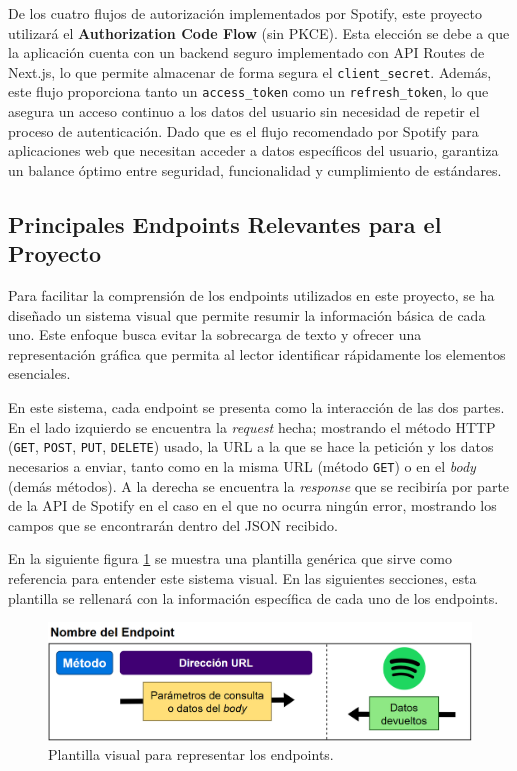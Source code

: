 De los cuatro flujos de autorización implementados por Spotify, este proyecto utilizará el \textbf{Authorization Code Flow} (sin PKCE). Esta elección se debe a que la aplicación cuenta con un backend seguro implementado con API Routes de Next.js, lo que permite almacenar de forma segura el \texttt{client\_secret}. Además, este flujo proporciona tanto un \texttt{access\_token} como un \texttt{refresh\_token}, lo que asegura un acceso continuo a los datos del usuario sin necesidad de repetir el proceso de autenticación. Dado que es el flujo recomendado por Spotify para aplicaciones web que necesitan acceder a datos específicos del usuario, garantiza un balance óptimo entre seguridad, funcionalidad y cumplimiento de estándares.

\subsection{Principales Endpoints Relevantes para el Proyecto}

Para facilitar la comprensión de los endpoints utilizados en este proyecto, se ha diseñado un sistema visual que permite resumir la información básica de cada uno. Este enfoque busca evitar la sobrecarga de texto y ofrecer una representación gráfica que permita al lector identificar rápidamente los elementos esenciales.

En este sistema, cada endpoint se presenta como la interacción de las dos partes. En el lado izquierdo se encuentra la \textit{request} hecha; mostrando el método HTTP (\texttt{GET}, \texttt{POST}, \texttt{PUT}, \texttt{DELETE}) usado, la URL a la que se hace la petición y los datos necesarios a enviar, tanto como en la misma URL (método \texttt{GET}) o en el \textit{body} (demás métodos). A la derecha se encuentra la \textit{response} que se recibiría por parte de la API de Spotify en el caso en el que no ocurra ningún error, mostrando los campos que se encontrarán dentro del JSON recibido.

En la siguiente figura \ref{fig:plantilla_endpoints} se muestra una plantilla genérica que sirve como referencia para entender este sistema visual. En las siguientes secciones, esta plantilla se rellenará con la información específica de cada uno de los endpoints.

\begin{figure}[H]
    \centering
    \includegraphics[width=\textwidth]{figures/plantilla_endpoints.png}
    \caption{Plantilla visual para representar los endpoints.}
    \label{fig:plantilla_endpoints}
\end{figure}


